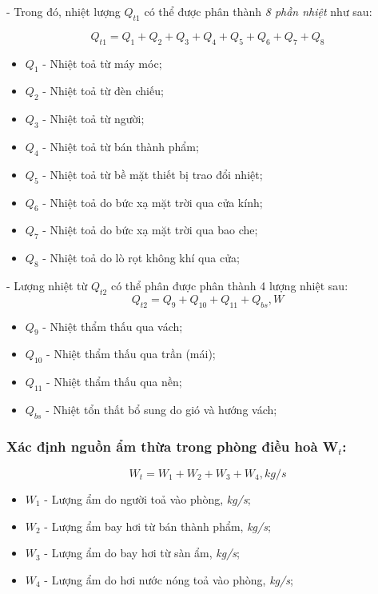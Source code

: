 - Trong đó, nhiệt lượng $ Q_{t1} $ có thể được phân thành \textit{8 phần nhiệt} như sau:

\begin{equation}
		Q_{t1} = Q_{1} + Q_{2} + Q_{3} + Q_{4} + Q_{5} + Q_{6} + Q_{7} + Q_{8}
\end{equation}

\begin{itemize}[leftmargin = 3cm, label = $\ast$]
	\item $Q_{1}$ - Nhiệt toả từ máy móc;
	\item $Q_{2}$ - Nhiệt toả từ đèn chiếu;
	\item $Q_{3}$ - Nhiệt toả từ người;
	\item $Q_{4}$ - Nhiệt toả từ bán thành phẩm;
	\item $Q_{5}$ - Nhiệt toả từ bề mặt thiết bị trao đổi nhiệt;
	\item $Q_{6}$ - Nhiệt toả do bức xạ mặt trời qua cửa kính;
	\item $Q_{7}$ - Nhiệt toả do bức xạ mặt trời qua bao che;
	\item $Q_{8}$ - Nhiệt toả do lò rọt không khí qua cửa;
\end{itemize}

- Lượng nhiệt từ $ Q_{t2} $ có thể phân được phân thành 4 lượng nhiệt sau:
\begin{equation}
	Q_{t2} = Q_{9} + Q_{10} + Q_{11} + Q_{bs}, \textit{W}
\end{equation}

\begin{itemize}[leftmargin = 3cm, label = $\ast$]
	\item $ Q_{9} $ - Nhiệt thẩm thấu qua vách;
	\item $ Q_{10} $ - Nhiệt thẩm thấu qua trần (mái);
	\item $ Q_{11} $ - Nhiệt thẩm thấu qua nền;
	\item $ Q_{bs} $ - Nhiệt tổn thất bổ sung do gió và hướng vách;
\end{itemize}


\subsubsection{Xác định nguồn ẩm thừa trong phòng điều hoà W$ _{t} $:}
\begin{equation}
	W_{t} = W_{1} + W_{2} + W_{3} + W_{4}, kg/s
\end{equation}

\begin{itemize}[leftmargin = 3cm, label = $\ast$]
	\item $ W_{1} $ - Lượng ẩm do người toả vào phòng, \textit{kg/s};
	\item $ W_{2} $ - Lượng ẩm bay hơi từ bán thành phẩm, \textit{kg/s};
	\item $ W_{3} $ - Lượng ẩm do bay hơi từ sàn ẩm, \textit{kg/s};
	\item $ W_{4} $ - Lượng ẩm do hơi nước nóng toả vào phòng, \textit{kg/s};	
\end{itemize}
	
